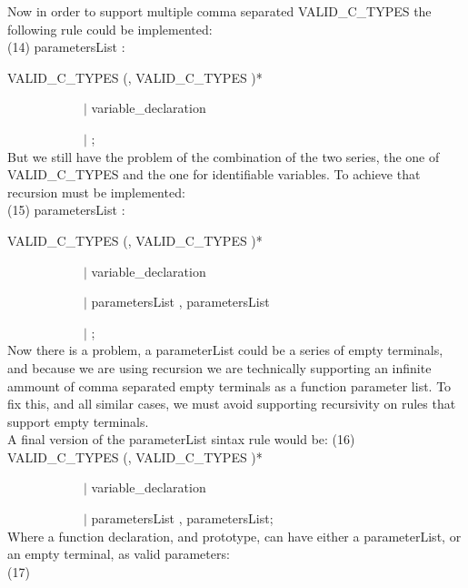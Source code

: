 \documentclass[twocolumn,10ptr]{article}
\begin{document}
Now in order to support multiple comma separated VALID\_C\_TYPES the following rule could be implemented:\\

(14) parametersList : 

VALID\_C\_TYPES   (\textsc{},\textsc{} VALID\_C\_TYPES )*

\ \ \ \ \ \ \ \ \ \ \ \      \(\mid\) variable\_declaration
			
\ \ \ \ \ \ \ \ \ \ \ \   	\(\mid\) ;\\

But we still have the problem of the combination of the two series, the one of VALID\_C\_TYPES and the one for identifiable variables.
To achieve that recursion must be implemented:\\

(15) parametersList :

 VALID\_C\_TYPES   (\textsc{},\textsc{} VALID\_C\_TYPES )*

\ \ \ \ \ \ \ \ \ \ \ \      \(\mid\) variable\_declaration

\ \ \ \ \ \ \ \ \ \ \ \      \(\mid\)  parametersList \textsc{},\textsc{}  parametersList
			
\ \ \ \ \ \ \ \ \ \ \ \   	\(\mid\) ;\\

Now there is a problem, a parameterList could be a series of empty terminals, and because we are using recursion we are technically supporting an infinite ammount of comma separated empty terminals as a function parameter list. To fix this, and all similar cases, we must avoid supporting recursivity on rules that support empty terminals.\\

A final version of the parameterList sintax rule would be: (16)\\

 VALID\_C\_TYPES   (\textsc{},\textsc{} VALID\_C\_TYPES )*

\ \ \ \ \ \ \ \ \ \ \ \      \(\mid\) variable\_declaration

\ \ \ \ \ \ \ \ \ \ \ \      \(\mid\)  parametersList \textsc{},\textsc{}  parametersList;\\

Where a function declaration, and prototype, can have either a parameterList, or an empty terminal, as valid parameters:\\

(17)\\
\end{document}
